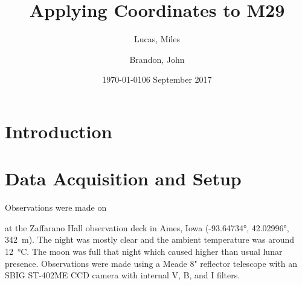 \documentclass[%
aip,
jmp,
reprint,
floatfix
]{revtex4-1}
\begin{document}
	\title[Applying Coordinates to M29]{Applying Coordinates to M29}

	\author{Lucas, Miles}
	\author{Brandon, John}

	\date{\today}



	\begin{abstract}

	\end{abstract}

	\maketitle


	\section{Introduction}

	



	\section{Data Acquisition and Setup}
	Observations were made on \date{06 September 2017} at the Zaffarano Hall observation deck in Ames, Iowa (\ang{-93.64734}, \ang{42.02996}, \SI{342}{\meter}). The night was mostly clear and the ambient temperature was around \SI{12}{\degreeCelsius}. The moon was full that night which caused higher than usual lunar presence. Observations were made using a Meade 8" reflector telescope with an SBIG ST-402ME CCD camera with internal V, B, and I filters. 
	
\end{document}
